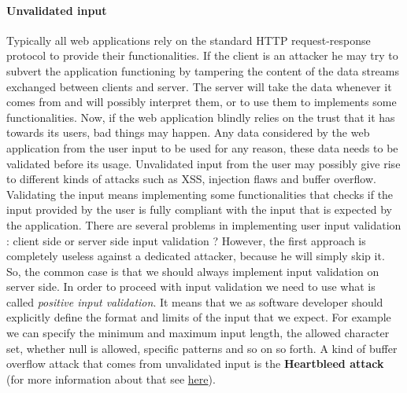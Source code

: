 \paragraph{Unvalidated input} Typically all web applications rely on the standard HTTP request-response protocol to provide their functionalities. If the client is an attacker he may try to subvert the application functioning by tampering the content of the data streams exchanged between clients and server. The server will take the data whenever it comes from and will possibly interpret them, or to use them to implements some functionalities. Now, if the web application blindly relies on the trust that it has towards its users, bad things may happen. Any data considered by the web application from the user input to be used for any reason, these data needs to be validated before its usage. Unvalidated input from the user may possibly give rise to different kinds of attacks such as XSS, injection flaws and buffer overflow. Validating the input means implementing some functionalities that checks if the input provided by the user is fully compliant with the input that is expected by the application. There are several problems in implementing user input validation : client side or server side input validation ? However, the first approach is completely useless against a dedicated attacker, because he will simply skip it. So, the common case is that we should always implement input validation on server side. In order to proceed with input validation we need to use what is called \textit{positive input validation}. It means that we as software developer should explicitly define the format and limits of the input that we expect. For example we can specify the minimum and maximum input length, the allowed character set, whether null is allowed, specific patterns and so on so forth. A kind of buffer overflow attack that comes from unvalidated input is the \textbf{Heartbleed attack} (for more information about that see \href{https://www.vox.com/2014/6/19/18076318/heartbleed}{here}). 

